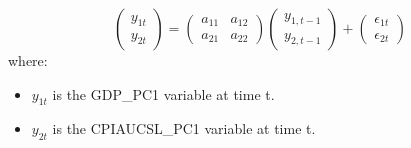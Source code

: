 \begin{equation}
    \label{VAR_1}
    \begin{pmatrix}
        y_{1t} \\
        y_{2t}
    \end{pmatrix}
    =
    \begin{pmatrix}
        a_{11} & a_{12} \\
        a_{21} & a_{22}
    \end{pmatrix}
    \begin{pmatrix}
        y_{1, t-1} \\
        y_{2, t-1}
    \end{pmatrix}
    +
    \begin{pmatrix}
        \epsilon_{1t} \\
        \epsilon_{2t}
    \end{pmatrix}
\end{equation}
where:
\begin{itemize}
    \item \(y_{1t}\) is the GDP\_PC1 variable at time t.
    \item \(y_{2t}\) is the CPIAUCSL\_PC1 variable at time t.
\end{itemize}

